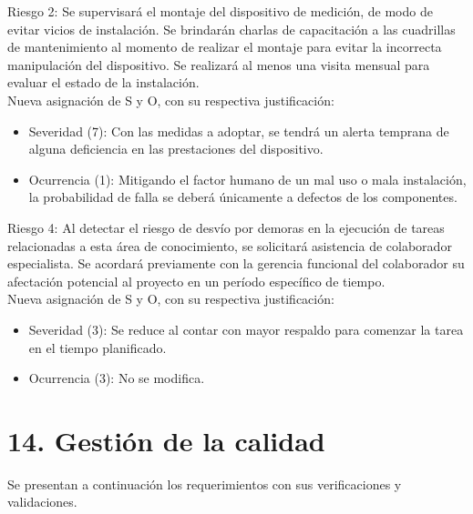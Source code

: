 \documentclass[
11pt, %
]{charter}
\begin{document}
Riesgo 2: Se supervisará el montaje del dispositivo de medición, de modo de evitar vicios de instalación. Se brindarán charlas de capacitación a las cuadrillas de mantenimiento al momento de realizar el montaje para evitar la incorrecta manipulación del dispositivo. Se realizará al menos una visita mensual para evaluar el estado de la instalación.\\
Nueva asignación de S y O, con su respectiva justificación:
\begin{itemize}
	\item Severidad (7): Con las medidas a adoptar, se tendrá un alerta temprana de alguna deficiencia en las prestaciones del dispositivo.
	\item Ocurrencia (1): Mitigando el factor humano de un mal uso o mala instalación, la probabilidad de falla se deberá únicamente a defectos de los componentes.
\end{itemize}
 
Riesgo 4: Al detectar el riesgo de desvío por demoras en la ejecución de tareas relacionadas a esta área de conocimiento, se solicitará asistencia de colaborador especialista. Se acordará previamente con la gerencia funcional del colaborador su afectación potencial al proyecto en un período específico de tiempo.\\
  Nueva asignación de S y O, con su respectiva justificación:
\begin{itemize}
	\item Severidad (3): Se reduce al contar con mayor respaldo para comenzar la tarea en el tiempo planificado.
	\item Ocurrencia (3): No se modifica.
\end{itemize}
 


\section{14. Gestión de la calidad}
\label{sec:calidad}

Se presentan a continuación los requerimientos con sus verificaciones y validaciones.

%
\end{document}
